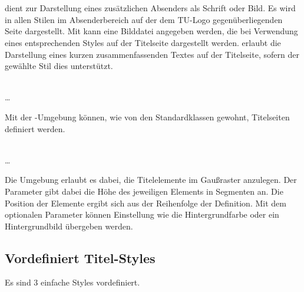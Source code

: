 \begin{Declaration}
  \\
  \\
\end{Declaration}

 dient zur Darstellung eines zusätzlichen Absenders als Schrift
oder Bild. Es wird in allen Stilen im Absenderbereich auf der dem
TU-Logo gegenüberliegenden Seite dargestellt.
Mit  kann eine Bilddatei angegeben werden, die bei
Verwendung eines entsprechenden Styles auf der Titelseite dargestellt werden.
 erlaubt die Darstellung eines kurzen zusammenfassenden
Textes auf der Titelseite, sofern der gewählte Stil dies unterstützt.

\begin{Declaration}
  \\
  \quad\dots\\
\end{Declaration}

Mit der -Umgebung können, wie von den Standardklassen
gewohnt, Titelseiten definiert werden.

\begin{Declaration}
    \\
  \quad\dots\\
\end{Declaration}

Die Umgebung  erlaubt es dabei, die Titelelemente im 
Gaußraster anzulegen. Der Parameter  gibt dabei
die Höhe des jeweiligen Elements in Segmenten an. Die Position der Elemente
ergibt sich aus der Reihenfolge der Definition.
Mit dem optionalen Parameter  können Einstellung wie die Hintergrundfarbe oder ein Hintergrundbild übergeben werden.

\subsection{Vordefiniert Titel-Styles}

Es sind 3 einfache Styles vordefiniert.


